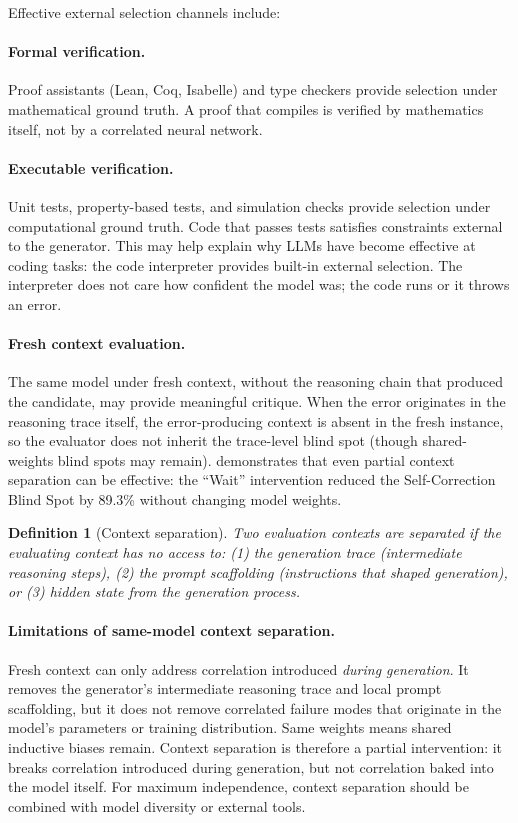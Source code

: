 \documentclass[11pt]{article}
\newtheorem{definition}[theorem]{Definition}
\begin{document}
Effective external selection channels include:

\paragraph{Formal verification.} Proof assistants (Lean, Coq, Isabelle) and type checkers provide selection under mathematical ground truth. A proof that compiles is verified by mathematics itself, not by a correlated neural network.

\paragraph{Executable verification.} Unit tests, property-based tests, and simulation checks provide selection under computational ground truth. Code that passes tests satisfies constraints external to the generator. This may help explain why LLMs have become effective at coding tasks: the code interpreter provides built-in external selection. The interpreter does not care how confident the model was; the code runs or it throws an error.

\paragraph{Fresh context evaluation.} The same model under fresh context, without the reasoning chain that produced the candidate, may provide meaningful critique. When the error originates in the reasoning trace itself, the error-producing context is absent in the fresh instance, so the evaluator does not inherit the trace-level blind spot (though shared-weights blind spots may remain). \citet{tsui2025selfcorrection} demonstrates that even partial context separation can be effective: the ``Wait'' intervention reduced the Self-Correction Blind Spot by 89.3\% without changing model weights.

\begin{definition}[Context separation]
\label{def:context_sep}
Two evaluation contexts are \emph{separated} if the evaluating context has no access to: (1) the generation trace (intermediate reasoning steps), (2) the prompt scaffolding (instructions that shaped generation), or (3) hidden state from the generation process.
\end{definition}

\paragraph{Limitations of same-model context separation.} Fresh context can only address correlation introduced \emph{during generation}. It removes the generator's intermediate reasoning trace and local prompt scaffolding, but it does not remove correlated failure modes that originate in the model's parameters or training distribution. Same weights means shared inductive biases remain. Context separation is therefore a partial intervention: it breaks correlation introduced during generation, but not correlation baked into the model itself. For maximum independence, context separation should be combined with model diversity or external tools.
\end{document}
